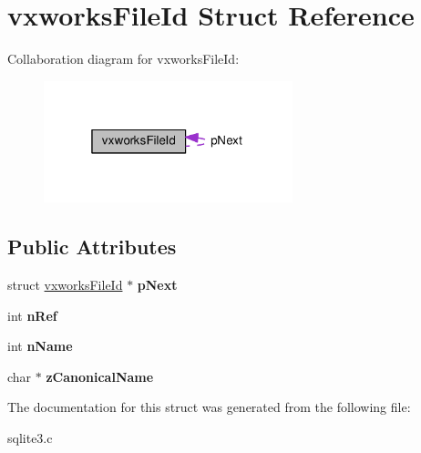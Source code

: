 \hypertarget{structvxworksFileId}{}\section{vxworks\+File\+Id Struct Reference}
\label{structvxworksFileId}


Collaboration diagram for vxworks\+File\+Id\+:\nopagebreak
\begin{figure}[H]
\begin{center}
\leavevmode
\includegraphics[width=205pt]{structvxworksFileId__coll__graph}
\end{center}
\end{figure}
\subsection*{Public Attributes}
\begin{DoxyCompactItemize}
\item 
struct \hyperlink{structvxworksFileId}{vxworks\+File\+Id} $\ast$ {\bfseries p\+Next}\hypertarget{structvxworksFileId_a1941104384e7aa1ad9d8574d091abe3a}{}\label{structvxworksFileId_a1941104384e7aa1ad9d8574d091abe3a}

\item 
int {\bfseries n\+Ref}\hypertarget{structvxworksFileId_a59dde49ee027786a06de8ad59b1d7883}{}\label{structvxworksFileId_a59dde49ee027786a06de8ad59b1d7883}

\item 
int {\bfseries n\+Name}\hypertarget{structvxworksFileId_af7ed9a749d73b74b534bc06baf1abf6d}{}\label{structvxworksFileId_af7ed9a749d73b74b534bc06baf1abf6d}

\item 
char $\ast$ {\bfseries z\+Canonical\+Name}\hypertarget{structvxworksFileId_a032c9aaaa13ff100d9f3cd53926587fe}{}\label{structvxworksFileId_a032c9aaaa13ff100d9f3cd53926587fe}

\end{DoxyCompactItemize}


The documentation for this struct was generated from the following file\+:\begin{DoxyCompactItemize}
\item 
sqlite3.\+c\end{DoxyCompactItemize}
